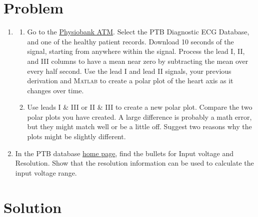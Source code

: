 \documentclass[12pt, a4paper]{article}
\begin{document}
\vspace*{-3mm}
\section*{Problem}
\begin{enumerate}
\item \begin{enumerate} \item
Go to the \href{http://physionet.org/cgi-bin/atm/ATM}{Physiobank ATM}. Select the PTB Diagnostic ECG Database, and one of the healthy patient records. Download 10 seconds of the signal, starting from anywhere within the signal.  Process the lead I, II, and III columns to have a mean near zero by subtracting the
mean over every half second. Use the lead I and lead II signals, your previous derivation and \textsc{Matlab} to create a
polar plot of the heart axis as it changes over time. 
\item
Use leads I \& III or II \& III to create a new polar plot. Compare the two polar plots
you have created. A large difference is probably a math error, but they might match
well or be a little off. Suggest two reasons why the plots might be slightly different. \end{enumerate}

\item
In the PTB database \href{http://physionet.org/physiobank/database/ptbdb/}{home page},
find the bullets for Input voltage and Resolution. Show that the resolution information
can be used to calculate the input voltage range.
\end{enumerate}

\section*{Solution}
\end{document}
